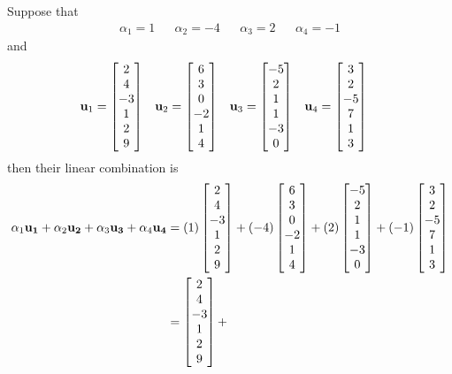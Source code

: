 \documentclass{ximera}
\begin{document}
\begin{example}
  Suppose that
  \begin{align*}
    \alpha_1=1&&\alpha_2=-4&&\alpha_3=2&&\alpha_4=-1
  \end{align*}
  and
  \begin{align*}
    \mathbf{u}_1&=\begin{bmatrix}2\\4\\-3\\1\\2\\9\end{bmatrix}&
    \mathbf{u}_2&=\begin{bmatrix}6\\3\\0\\-2\\1\\4\end{bmatrix}&
    \mathbf{u}_3&=\begin{bmatrix}-5\\2\\1\\1\\-3\\0\end{bmatrix}&
    \mathbf{u}_4&=\begin{bmatrix}3\\2\\-5\\7\\1\\3\end{bmatrix}
  \end{align*}
  then their linear combination is
  \begin{align*}
    \alpha_1\vect{u_1}+ \alpha_2\vect{u_2}+ \alpha_3\vect{u_3}+ \alpha_4\vect{u_4}&=
    (1)\colvector{2\\4\\-3\\1\\2\\9}+
    (-4)\colvector{6\\3\\0\\-2\\1\\4}+
    (2)\colvector{-5\\2\\1\\1\\-3\\0}+
    (-1)\colvector{3\\2\\-5\\7\\1\\3}\\
    &=
    \colvector{2\\4\\-3\\1\\2\\9}+

\end{align*}
\end{example}
\end{document}
